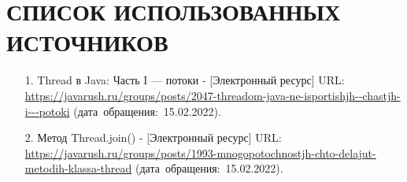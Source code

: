 \documentclass[12pt, a4paper, simple]{eskdtext}
\begin{document}
    \section*{СПИСОК ИСПОЛЬЗОВАННЫХ ИСТОЧНИКОВ}
    \begin{enumerate}
        \item[1.] Thread в Java: Часть I — потоки - [Электронный ресурс]
        URL: \url{https://javarush.ru/groups/posts/2047-threadom-java-ne-isportishjh--chastjh-i---potoki}
        (дата~обращения:~15.02.2022).
        \item[2.] Метод Thread.join() - [Электронный ресурс]
        URL: \url{https://javarush.ru/groups/posts/1993-mnogopotochnostjh-chto-delajut-metodih-klassa-thread}
        (дата~обращения:~15.02.2022).
    \end{enumerate}
    \newpage
\end{document}
